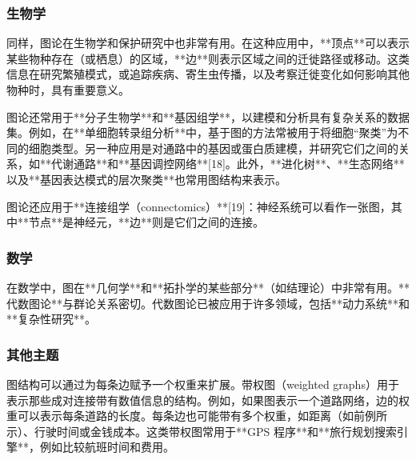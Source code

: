 \subsubsection{生物学}
同样，图论在生物学和保护研究中也非常有用。在这种应用中，**顶点**可以表示某些物种存在（或栖息）的区域，**边**则表示区域之间的迁徙路径或移动。这类信息在研究繁殖模式，或追踪疾病、寄生虫传播，以及考察迁徙变化如何影响其他物种时，具有重要意义。

图论还常用于**分子生物学**和**基因组学**，以建模和分析具有复杂关系的数据集。例如，在**单细胞转录组分析**中，基于图的方法常被用于将细胞“聚类”为不同的细胞类型。另一种应用是对通路中的基因或蛋白质建模，并研究它们之间的关系，如**代谢通路**和**基因调控网络**[18]。此外，**进化树**、**生态网络**以及**基因表达模式的层次聚类**也常用图结构来表示。

图论还应用于**连接组学（connectomics）**[19]：神经系统可以看作一张图，其中**节点**是神经元，**边**则是它们之间的连接。
\subsubsection{数学}
在数学中，图在**几何学**和**拓扑学的某些部分**（如结理论）中非常有用。**代数图论**与群论关系密切。代数图论已被应用于许多领域，包括**动力系统**和**复杂性研究**。
\subsubsection{其他主题}
图结构可以通过为每条边赋予一个权重来扩展。带权图（weighted graphs）用于表示那些成对连接带有数值信息的结构。例如，如果图表示一个道路网络，边的权重可以表示每条道路的长度。每条边也可能带有多个权重，如距离（如前例所示）、行驶时间或金钱成本。这类带权图常用于**GPS 程序**和**旅行规划搜索引擎**，例如比较航班时间和费用。
